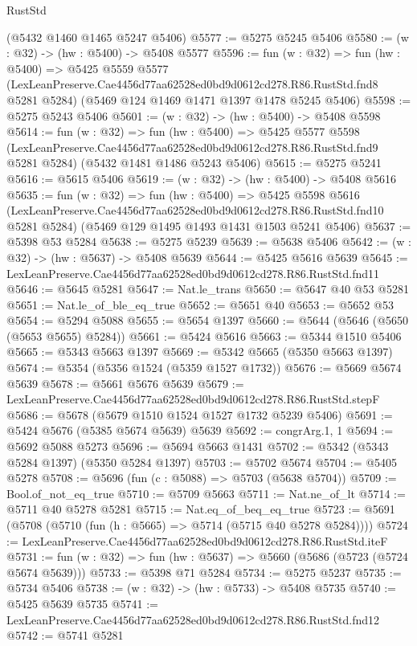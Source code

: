 \begin{lexlean}{RustStd}
\begin{coremodule}
    (@5432 @1460 @1465 @5247 @5406)
@5577 := @5275 @5245 @5406
@5580 := (w : @32) -> (hw : @5400) -> @5408 @5577
@5596 := fun (w : @32) =>
  fun (hw : @5400) =>
  @5425
    @5559
    @5577
    (LexLeanPreserve.Cae4456d77aa62528ed0bd9d0612cd278.R86.RustStd.fnd8 @5281 @5284)
    (@5469 @124 @1469 @1471 @1397 @1478 @5245 @5406)
@5598 := @5275 @5243 @5406
@5601 := (w : @32) -> (hw : @5400) -> @5408 @5598
@5614 := fun (w : @32) =>
  fun (hw : @5400) =>
  @5425
    @5577
    @5598
    (LexLeanPreserve.Cae4456d77aa62528ed0bd9d0612cd278.R86.RustStd.fnd9 @5281 @5284)
    (@5432 @1481 @1486 @5243 @5406)
@5615 := @5275 @5241
@5616 := @5615 @5406
@5619 := (w : @32) -> (hw : @5400) -> @5408 @5616
@5635 := fun (w : @32) =>
  fun (hw : @5400) =>
  @5425
    @5598
    @5616
    (LexLeanPreserve.Cae4456d77aa62528ed0bd9d0612cd278.R86.RustStd.fnd10 @5281 @5284)
    (@5469 @129 @1495 @1493 @1431 @1503 @5241 @5406)
@5637 := @5398 @53 @5284
@5638 := @5275 @5239
@5639 := @5638 @5406
@5642 := (w : @32) -> (hw : @5637) -> @5408 @5639
@5644 := @5425 @5616 @5639
@5645 := LexLeanPreserve.Cae4456d77aa62528ed0bd9d0612cd278.R86.RustStd.fnd11
@5646 := @5645 @5281
@5647 := Nat.le_trans
@5650 := @5647 @40 @53 @5281
@5651 := Nat.le_of_ble_eq_true
@5652 := @5651 @40
@5653 := @5652 @53
@5654 := @5294 @5088
@5655 := @5654 @1397
@5660 := @5644 (@5646 (@5650 (@5653 @5655) @5284))
@5661 := @5424 @5616
@5663 := @5344 @1510 @5406
@5665 := @5343 @5663 @1397
@5669 := @5342 @5665 (@5350 @5663 @1397)
@5674 := @5354 (@5356 @1524 (@5359 @1527 @1732))
@5676 := @5669 @5674 @5639
@5678 := @5661 @5676 @5639
@5679 := LexLeanPreserve.Cae4456d77aa62528ed0bd9d0612cd278.R86.RustStd.stepF
@5686 := @5678 (@5679 @1510 @1524 @1527 @1732 @5239 @5406)
@5691 := @5424 @5676 (@5385 @5674 @5639) @5639
@5692 := congrArg.{1, 1}
@5694 := @5692 @5088 @5273
@5696 := @5694 @5663 @1431
@5702 := @5342 (@5343 @5284 @1397) (@5350 @5284 @1397)
@5703 := @5702 @5674
@5704 := @5405 @5278
@5708 := @5696 (fun (c : @5088) => @5703 (@5638 @5704))
@5709 := Bool.of_not_eq_true
@5710 := @5709 @5663
@5711 := Nat.ne_of_lt
@5714 := @5711 @40 @5278 @5281
@5715 := Nat.eq_of_beq_eq_true
@5723 := @5691 (@5708 (@5710 (fun (h : @5665) => @5714 (@5715 @40 @5278 @5284))))
@5724 := LexLeanPreserve.Cae4456d77aa62528ed0bd9d0612cd278.R86.RustStd.iteF
@5731 := fun (w : @32) => fun (hw : @5637) => @5660 (@5686 (@5723 (@5724 @5674 @5639)))
@5733 := @5398 @71 @5284
@5734 := @5275 @5237
@5735 := @5734 @5406
@5738 := (w : @32) -> (hw : @5733) -> @5408 @5735
@5740 := @5425 @5639 @5735
@5741 := LexLeanPreserve.Cae4456d77aa62528ed0bd9d0612cd278.R86.RustStd.fnd12
@5742 := @5741 @5281

\end{coremodule}
\end{lexlean}
